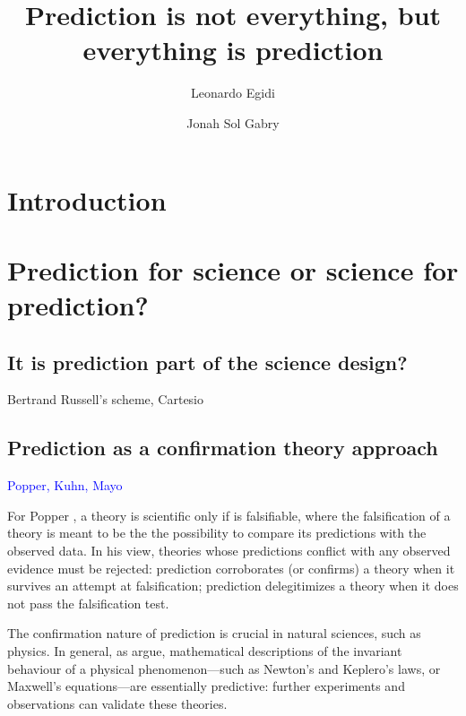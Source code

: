 \documentclass{statsoc}
\title[]{Prediction is not everything, but everything is prediction}
\author[Egidi and Gabry]{Leonardo Egidi}
\author[Egidi and Gabry]{Jonah Sol Gabry}
\begin{document}
\maketitle

\begin{abstract}


\end{abstract}

\section{Introduction}

\section{Prediction for science or science for prediction?}

\subsection{It is prediction part of the science design?}

\color{blue}

Bertrand Russell's scheme, Cartesio

\color{black}

\subsection{Prediction as a confirmation theory approach}

\textcolor{blue}{Popper, Kuhn, Mayo}

For Popper \citep{popper2005logic}, a theory is scientific only if is falsifiable, where the falsification of a theory is meant to be the the possibility to compare its predictions 
with the observed data. In his view, theories whose predictions conflict with any observed evidence must be rejected: prediction corroborates (or confirms) a theory when it survives 
an attempt at falsification; prediction delegitimizes a theory when it does not pass the falsification test.

The confirmation nature of prediction is crucial in natural sciences, such as physics. In general,  as \cite{hitchcock2004prediction} argue,   mathematical descriptions of the 
invariant behaviour of a physical phenomenon---such as Newton's and Keplero's laws, or Maxwell's equations---are essentially predictive: further experiments and observations can validate these theories. 
\end{document}
